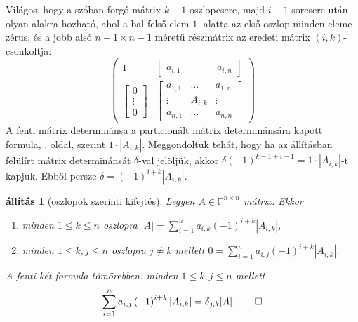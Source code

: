 \documentclass[9pt, a4paper, showtrims]{memoir}
\makeatletter
\renewenvironment{proof}[1][\proofname]
    {\par\pushQED{\qed}%
    \normalfont \topsep6\p@\@plus6\p@\relax
    \trivlist
    \item[\hskip\labelsep
        \itshape
    #1\@addpunct{:}]\ignorespaces}
    {\popQED\endtrivlist\@endpefalse}
\theoremstyle{plain}
\newtheorem{proposition}{állítás}[chapter]
\theoremstyle{remark}
\theoremstyle{definition}
\makeatother
\begin{document}
\begin{proof}
	Világos, hogy a szóban forgó mátrix $k-1$ oszlopcsere, 
    majd $i-1$ sorcsere után olyan alakra hozható,
	ahol a bal felső elem $1$, alatta az első oszlop minden eleme zérus,
	és a jobb alsó $n-1\times n-1$ méretű részmátrix az eredeti mátrix $\left( i,k \right)$-csonkoltja:
	\[
		\begin{pmatrix}
			1 & \begin{bmatrix}
				a_{i,1}\, & \phantom{A_{i,k}} & \,a_{i,n}
			\end{bmatrix} \\
			\begin{bmatrix}
				0      \\
				\vdots \\
				0
			\end{bmatrix}
			  &
			\begin{bmatrix}
				a_{1,1} & \dots   & a_{1,n} \\
				\vdots  & A_{i,k} & \vdots  \\
				a_{n,1} & \dots   & a_{n,n}
			\end{bmatrix}
		\end{pmatrix}
	\]
	A fenti mátrix determinánsa a particionált mátrix determinánsára kapott formula,
	. oldal,
	szerint $1\cdot|A_{i,k}|$.
	Meggondoltuk tehát, hogy ha az állításban felülírt mátrix determinánsát $\delta$-val jelöljük,
	akkor  $\delta\left( -1 \right)^{k-1+i-1}=1\cdot|A_{i,k}|$-t kapjuk.
	Ebből persze
	\begin{math}
		\delta
		=\left( -1 \right)^{i+k}|A_{i,k}|.
	\end{math}
\end{proof}
\begin{proposition}[oszlopok szerinti kifejtés]
	Legyen $A\in\mathbb{F}^{n\times n}$ mátrix.
	Ekkor
	\begin{enumerate}
		\item minden $1\leq k\leq n$ oszlopra
		      \(
		      |A|=
		      \sum_{i=1}^na_{i,k}\left( -1 \right)^{i+k}|A_{i,k}|,
		      \)
		\item minden $1\leq k,j\leq n$ oszlopra $j\neq k$ mellett
		      \(
		      0=
		      \sum_{i=1}^na_{i,j}\left( -1 \right)^{i+k}|A_{i,k}|.
		      \)
	\end{enumerate}
	A fenti két formula tömörebben: minden $1\leq k,j\leq n$ mellett
	\[
		\sum_{i=1}^na_{i,j}\left( -1 \right)^{i+k}|A_{i,k}|
		=
		\delta_{j,k}|A|.\qedhere
	\]
\end{proposition}
\end{document}
